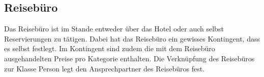 \documentclass[../../Pflichtenheft.tex]{subfiles}
\begin{document}
    \subsection{Reisebüro}
    Das Reisebüro ist im Stande entweder über das Hotel oder auch selbst Reservierungen zu tätigen.
    Dabei hat das Reisebüro ein gewisses Kontingent, dass es selbst festlegt. Im Kontingent sind zudem
    die mit dem Reisebüro ausgehandelten Preise pro Kategorie enthalten. Die Verknüpfung des Reisebüros
    zur Klasse Person legt den Ansprechpartner des Reisebüros fest.
\end{document}
